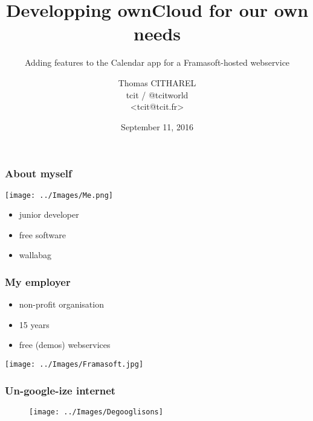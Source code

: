 \documentclass[11pt]{beamer}
\author{Thomas CITHAREL\\tcit / @tcitworld\\ \textless tcit@tcit.fr\textgreater}
\title{Developping ownCloud for our own needs}
\subtitle{Adding features to the Calendar app for a Framasoft-hosted webservice}
\date{September 11, 2016}
\begin{document}
	\maketitle
	
	\begin{frame}
		\frametitle{About myself}
		\begin{minipage}{0.45\textwidth}
			\begin{flushleft}
			\begin{center}
				\texttt{[image: ../Images/Me.png]}
			\end{center}
			\label{publication-calendrier}
		\end{flushleft}
		\end{minipage}
		\begin{minipage}{0.45\textwidth}
			\begin{flushright}
				\begin{itemize}
					\item junior developer
					\item free software
					\item wallabag
				\end{itemize}
			\end{flushright}
		\end{minipage}
	\end{frame}
	\begin{frame}
		\frametitle{My employer}
		\begin{minipage}{0.45\textwidth}
			\begin{flushleft}
		\begin{itemize}
			\item non-profit organisation
			\item 15 years
			\item free (demos) webservices
		\end{itemize}
	\end{flushleft}
\end{minipage}
\begin{minipage}{0.45\textwidth}
	\begin{flushright}
		\begin{center}
			\texttt{[image: ../Images/Framasoft.jpg]}
		\end{center}
	\end{flushright}
\end{minipage}
	\end{frame}
	\begin{frame}
		\frametitle{Un-google-ize internet}
		\begin{figure}
\centering
\texttt{[image: ../Images/Degooglisons]}
\caption{}
\label{fig:Framasoft}
\end{figure}

	\end{frame}
\end{document}
